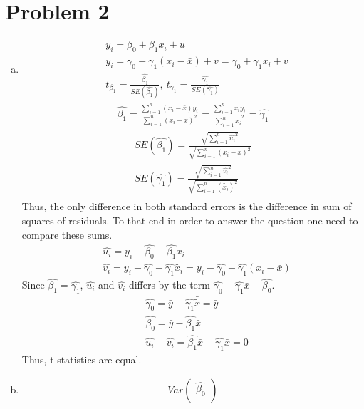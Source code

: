 \documentclass[a4paper]{article}
\newcommand{\summa}{\sum_{i=1}^n}
\begin{document}
\section*{Problem 2}
\begin{enumerate}[(a)]
	\item \begin{align*}
	&y_i = \beta_0 + \beta_1 x_{i} + u\\
	&y_i = \gamma_0 + \gamma_1(x_i - \bar{x}) + v = \gamma_0 + \gamma_1 \tilde{x_i} + v\\
	&t_{\beta_1} = \frac{\hat{\beta_1}}{SE(\hat{\beta_1})},\  t_{\gamma_1} = \frac{\hat{\gamma_1}}{SE(\hat{\gamma_1})}
	\end{align*}
	\begin{align*}
	\hat{\beta_1} = \frac{\summa (x_i - \bar{x})y_i}{\summa (x_i - \bar{x})^2} = \frac{\summa \tilde{x_i} y_i}{\summa \tilde{x_i}^2} = \hat{\gamma_1}
	\end{align*}
	\begin{align*}
	SE(\hat{\beta_1}) = \frac{\sqrt{\summa \hat{u_i}^2}}{\sqrt{\summa (x_i - \bar{x})^2}}\\
	SE(\hat{\gamma_1}) = \frac{\sqrt{\summa \hat{v_i}^2}}{\sqrt{\summa (\tilde{x_i})^2}}\\
	\end{align*}
	Thus, the only difference in both standard errors is the difference in sum of squares of residuals. To that end in order to answer the question one need to compare these sums.
	\begin{align*}
	&\hat{u_i} = y_i - \hat{\beta_0} - \hat{\beta_1}x_{i}\\
	&\hat{v_i} = y_i - \hat{\gamma_0} - \hat{\gamma_1}\tilde{x_i} = y_i - \hat{\gamma_0} - \hat{\gamma_1}(x_i - \bar{x})
	\end{align*}
	Since $\hat{\beta_1} = \hat{\gamma_1}$, $\hat{u_i}$ and $\hat{v_i}$ differs by the term $\hat{\gamma_0} - \hat{\gamma_1}\bar{x} - \hat{\beta_0}$.
	\begin{align*}
	&\hat{\gamma_0} = \bar{y} - \hat{\gamma_1}\bar{\tilde{x}} = \bar{y}\\
	&\hat{\beta_0} = \bar{y} - \hat{\beta_1}\bar{x}\\
	&\hat{u_i} - \hat{v_i} = \hat{\beta_1}\bar{x} - \hat{\gamma_1}\bar{x} = 0
	\end{align*}
	Thus, t-statistics are equal.
	\item
	\begin{align*}
	Var \begin{pmatrix}
	\hat{\beta_0}\\

\end{pmatrix}
\end{align*}
\end{enumerate}
\end{document}
